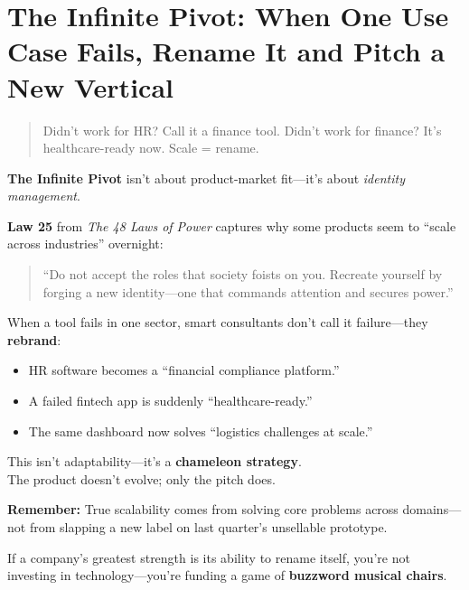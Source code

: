 \section{The Infinite Pivot: When One Use Case Fails, Rename It and Pitch a New Vertical}

\begin{quote}
Didn’t work for HR? Call it a finance tool. Didn’t work for finance? It’s healthcare-ready now. Scale = rename.
\end{quote}

  \textbf{The Infinite Pivot} isn’t about product-market fit—it’s about \textit{identity management}.
  
  \medskip
  
  \textbf{Law 25} from \textit{The 48 Laws of Power} captures why some products seem to ``scale across industries'' overnight:
  \begin{quote}
  ``Do not accept the roles that society foists on you. Recreate yourself by forging a new identity—one that commands attention and secures power.''
  \end{quote}
  
  \medskip
  
  When a tool fails in one sector, smart consultants don’t call it failure—they \textbf{rebrand}:
  
  \begin{itemize}
    \item HR software becomes a ``financial compliance platform.''
    \item A failed fintech app is suddenly ``healthcare-ready.''
    \item The same dashboard now solves ``logistics challenges at scale.''
  \end{itemize}
  
  \medskip
  
  This isn’t adaptability—it’s a \textbf{chameleon strategy}. \\
  The product doesn’t evolve; only the pitch does.
  
  \medskip
  
  \textbf{Remember:} True scalability comes from solving core problems across domains—not from slapping a new label on last quarter’s unsellable prototype.
  
  \medskip
  
  If a company’s greatest strength is its ability to rename itself, you’re not investing in technology—you’re funding a game of \textbf{buzzword musical chairs}.
  


